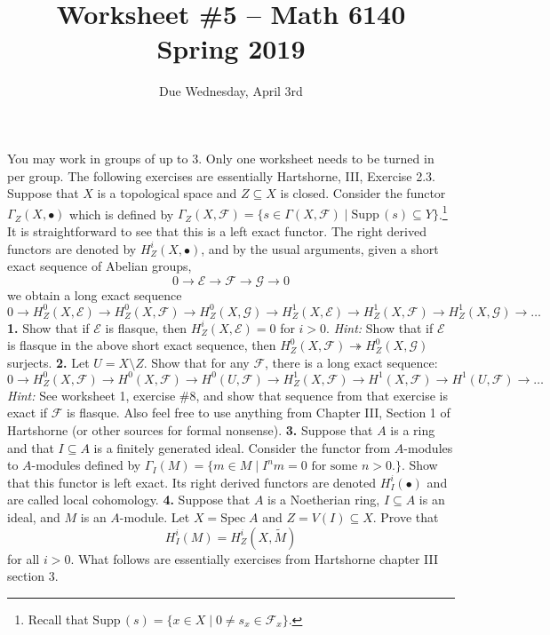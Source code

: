 \documentclass[11pt]{amsart}
\theoremstyle{theorem}
\renewcommand{\to}[1][]{\xrightarrow{\ #1\ }}
\newcommand{\Supp}{\mathrm{Supp}\,}
\newcommand{\cE}{\mathcal{E}}
\newcommand{\cF}{\mathcal{F}}
\newcommand{\cG}{\mathcal{G}}
\begin{document}
\title{Worksheet \#5 -- Math 6140\\Spring 2019}
\author{Due Wednesday, April 3rd}

\maketitle
You may work in groups of up to 3.  Only one worksheet needs to be turned in per group.
\vskip 9pt
\noindent
The following exercises are essentially Hartshorne, III, Exercise 2.3.  \vskip 9pt
\noindent
Suppose that $X$ is a topological space and $Z \subseteq X$ is closed.  Consider the functor $\Gamma_Z(X, \bullet)$ which is defined by $\Gamma_Z(X, \cF) = \{s \in \Gamma(X, \cF)\;|\; \Supp(s) \subseteq Y \}$.\footnote{Recall that $\Supp(s) = \{x \in X\;|\;0\neq s_x \in \cF_x\}$.}  It is straightforward to see that this is a left exact functor.  The right derived functors are denoted by $H^i_Z(X, \bullet)$, and by the usual arguments, given a short exact sequence of Abelian groups,
\[
0 \to \cE \to \cF \to \cG \to 0
\]
we obtain a long exact sequence
\[
0 \to H^0_Z(X, \cE) \to H^0_Z(X, \cF) \to H^0_Z(X, \cG) \to H^1_Z(X, \cE) \to H^1_Z(X, \cF) \to H^1_Z(X, \cG) \to \dots
\]
\noindent
{\bf 1.}  Show that if $\cE$ is flasque, then $H^i_Z(X, \cE) = 0$ for $i > 0$.
\vskip 3pt
\emph{Hint:} Show that if $\cE$ is flasque in the above short exact sequence, then $H^0_Z(X, \cF) \twoheadrightarrow H^0_Z(X, \cG)$ surjects.
\newpage
\noindent
{\bf 2.}  Let $U = X \setminus Z$.  Show that for any $\cF$, there is a long exact sequence:
\[
0 \to H^0_Z(X, \cF) \to H^0(X, \cF) \to H^0(U, \cF) \to H^1_Z(X, \cF) \to H^1(X, \cF) \to H^1(U, \cF) \to \dots
\]
\vskip 3pt
\emph{Hint:} See worksheet 1, exercise \#8, and show that sequence from that exercise is exact if $\cF$ is flasque.  Also feel free to use anything from Chapter III, Section 1 of Hartshorne (or other sources for formal nonsense).
\vskip 250pt
\noindent
{\bf 3.}  Suppose that $A$ is a ring and that $I \subseteq A$ is a finitely generated ideal.  Consider the functor from $A$-modules to $A$-modules defined by $\Gamma_I(M) = \{m \in M \;|\; I^n m = 0 \text{ for some $n > 0$.} \}$.  Show that this functor is left exact.  Its right derived functors are denoted $H^i_I(\bullet)$ and are called local cohomology.
\vskip 200pt
\newpage
\noindent
{\bf 4.}  Suppose that $A$ is a Noetherian ring, $I \subseteq A$ is an ideal, and $M$ is an $A$-module.  Let $X = \mathrm{Spec}\; A$ and $Z = V(I) \subseteq X$.  Prove that
\[
H^i_I(M) = H^i_Z(X, \widetilde{M})
\]
for all $i > 0$.
\vskip 200pt
What follows are essentially exercises from Hartshorne chapter III section 3.
\end{document}
